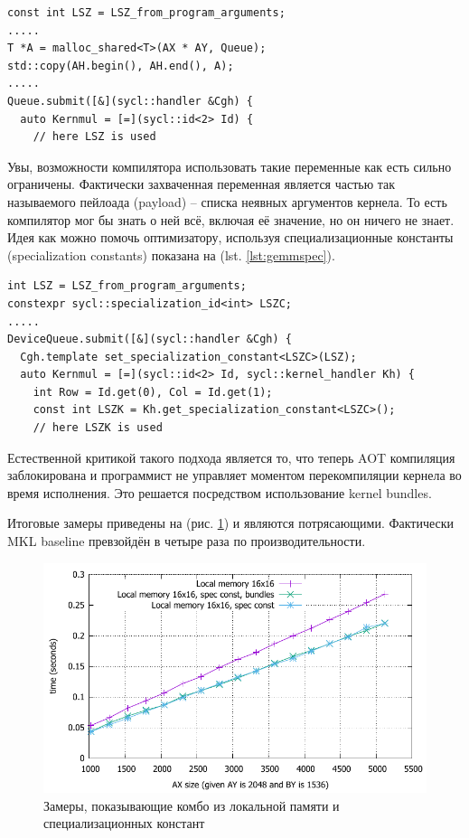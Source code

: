 \documentclass[a4paper,12pt,oneside]{article}
\begin{document}
\begin{lstlisting}[caption={Захваченные переменные в payload},label={lst:gemmpayload}]
const int LSZ = LSZ_from_program_arguments;
.....
T *A = malloc_shared<T>(AX * AY, Queue);
std::copy(AH.begin(), AH.end(), A);
.....
Queue.submit([&](sycl::handler &Cgh) { 
  auto Kernmul = [=](sycl::id<2> Id) {    
    // here LSZ is used
\end{lstlisting}

Увы, возможности компилятора использовать такие переменные как есть сильно ограничены.
Фактически захваченная переменная является частью так называемого пейлоада (payload) -- списка неявных аргументов кернела.
То есть компилятор мог бы знать о ней всё, включая её значение, но он ничего не знает.
Идея как можно помочь оптимизатору, используя специализационные константы (specialization constants) показана на (lst. \ref{lst:gemmspec}).

\begin{lstlisting}[caption={Специализационные константы},label={lst:gemmspec}]
int LSZ = LSZ_from_program_arguments;
constexpr sycl::specialization_id<int> LSZC;
.....
DeviceQueue.submit([&](sycl::handler &Cgh) {
  Cgh.template set_specialization_constant<LSZC>(LSZ);
  auto Kernmul = [=](sycl::id<2> Id, sycl::kernel_handler Kh) {
    int Row = Id.get(0), Col = Id.get(1);    
    const int LSZK = Kh.get_specialization_constant<LSZC>();
    // here LSZK is used
\end{lstlisting}

Естественной критикой такого подхода является то, что теперь AOT компиляция заблокирована и программист не управляет моментом перекомпиляции кернела во время исполнения.
Это решается посредством использование kernel bundles.


Итоговые замеры приведены на (рис. \ref{fig:sgemm_lsz_spec}) и являются потрясающими. Фактически MKL baseline превзойдён в четыре раза по производительности.

\begin{figure}
\centering
\includegraphics[width=1.0\textwidth]{pictures/sgemm_lsz_spec.pdf}
\caption{Замеры, показывающие комбо из локальной памяти и специализационных констант}
\label{fig:sgemm_lsz_spec}
\end{figure}
\end{document}
